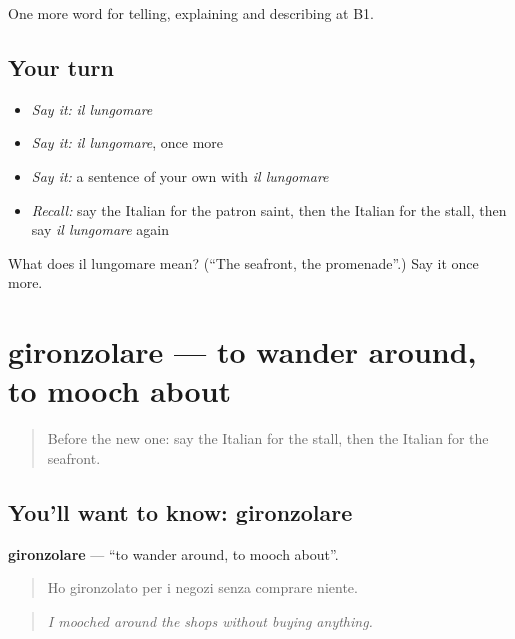 \begin{grammarlens}[title={What you've built}]
One more word for telling, explaining and describing at B1.
\end{grammarlens}

\subsection*{Your turn}
\begin{itemize}
\raggedright
  \item \emph{Say it:} \emph{il lungomare}
  \item \emph{Say it:} \emph{il lungomare}, once more
  \item \emph{Say it:} a sentence of your own with \emph{il lungomare}
  \item \emph{Recall:} say the Italian for the patron saint, then the Italian for the stall, then say \emph{il lungomare} again
\end{itemize}

\begin{tcolorbox}[breakable,colback=teal!4,colframe=teal!35!black,title={Before you move on}]
What does il lungomare mean? (\textquotedblleft{}The seafront, the promenade\textquotedblright{}.) Say it once more.
\end{tcolorbox}
\section[gironzolare]{gironzolare — to wander around, to mooch about}

\label{lesson:IT-C451-gironzolare}



\begin{quote}
Before the new one: say the Italian for the stall, then the Italian for the seafront.
\end{quote}

\subsection*{You'll want to know: gironzolare}
\textbf{gironzolare} — \textquotedblleft{}to wander around, to mooch about\textquotedblright{}.

\begin{quote}
Ho gironzolato per i negozi senza comprare niente.
\end{quote}

\begin{quote}
\emph{I mooched around the shops without buying anything.}
\end{quote}

